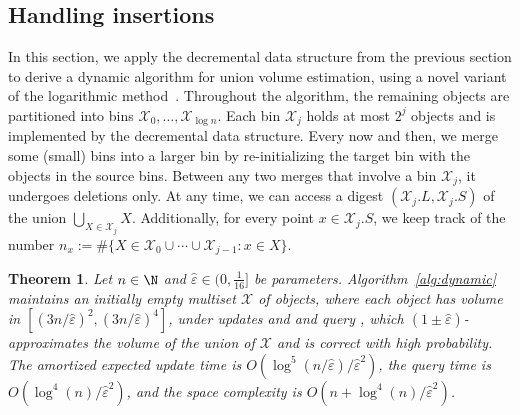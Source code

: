 \documentclass[a4paper, 11pt]{article}
\newtheorem{theorem}{Theorem}[section]
\newcommand{\eps}{\varepsilon}
\newcommand{\class}[1]{\mathcal{#1}}
\begin{document}
\subsection{Handling insertions}
In this section, we apply the decremental data structure from the previous section to derive a dynamic algorithm for union volume estimation, using a novel variant of the logarithmic method~\cite{BS80}. Throughout the algorithm, the remaining objects are partitioned into bins $\class{X}_0, \dots, \class{X}_{\log n}$. Each bin $\class{X}_j$ holds at most $2^j$ objects and is implemented by the decremental data structure. Every now and then, we merge some (small) bins into a larger bin by re-initializing the target bin with the objects in the source bins. Between any two merges that involve a bin $\class{X}_j$, it undergoes deletions only. At any time, we can access a digest $(\class{X}_j.L, \class{X}_j.S)$ of the union $\bigcup_{X \in \class{X}_j} X$. Additionally, for every point $x \in \class{X}_j.S$, we keep track of the number $n_x := \#\{ X \in \class{X}_0 \cup \cdots \cup \class{X}_{j-1} : x \in X \}$.

\begin{theorem}\label{thm:dynamicintermediate}
    Let $n \in \N$ and $\hat \eps \in (0,\frac{1}{16}]$ be parameters. 
    Algorithm~\ref{alg:dynamic} maintains an initially empty multiset $\class{X}$ of objects, where each object has volume in $[(3n/\hat \eps)^2, (3n/\hat \eps)^4]$, under updates  and  and query \est{}, which $(1\pm\hat \eps)$-approximates the volume of the union of $\class{X}$ and is correct with high probability. The amortized expected update time is $O(\log^5(n/\hat \eps)/\hat \eps^2)$, the query time is $O(\log^4(n)/\hat \eps^2)$, and the space complexity is $O(n + \log^4(n)/\hat \eps^2)$.
\end{theorem}
\end{document}
